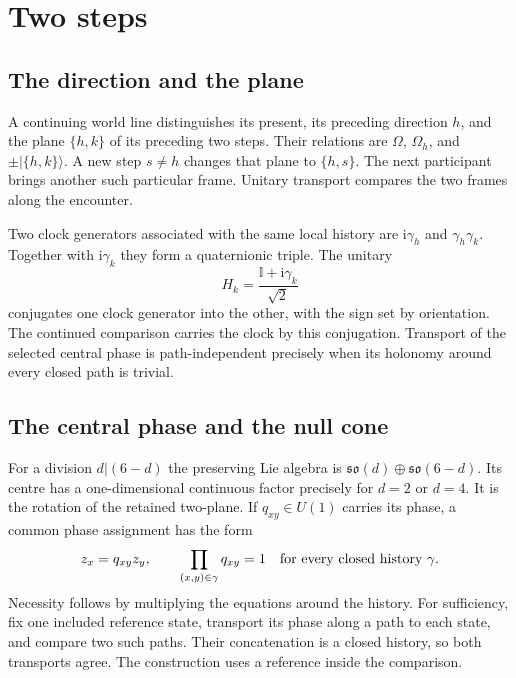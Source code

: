 \documentclass[aps,prx,onecolumn,10pt,notitlepage,nofootinbib,longbibliography]{revtex4-2}
\numberwithin{equation}{section}
\numberwithin{table}{section}
\newcommand{\Id}{\mathbb I}
\newcommand{\ii}{\mathrm i}
\begin{document}
\section{Two steps}
\label{sec:step-two}

\subsection{The direction and the plane}
A continuing world line distinguishes its present, its preceding direction $h$, and the plane $\{h,k\}$ of its preceding two steps. Their relations are $\Omega$, $\Omega_h$, and $\pm \lvert\{h,k\}\rangle$. A new step $s\ne h$ changes that plane to $\{h,s\}$. The next participant brings another such particular frame. Unitary transport compares the two frames along the encounter.

Two clock generators associated with the same local history are $\ii\gamma_h$ and $\gamma_h\gamma_k$. Together with $\ii\gamma_k$ they form a quaternionic triple. The unitary
\begin{equation}
 H_k=\frac{\Id+\ii\gamma_k}{\sqrt2}
\end{equation}
conjugates one clock generator into the other, with the sign set by orientation. The continued comparison carries the clock by this conjugation. Transport of the selected central phase is path-independent precisely when its holonomy around every closed path is trivial.

\subsection{The central phase and the null cone}

For a division $d|(6-d)$ the preserving Lie algebra is
$\mathfrak{so}(d)\oplus\mathfrak{so}(6-d)$. Its centre has a one-dimensional
continuous factor precisely for $d=2$ or $d=4$. It is the rotation of the
retained two-plane. If $q_{xy}\in U(1)$ carries its phase, a common phase
assignment has the form
\begin{equation}
 z_x=q_{xy}z_y,
 \qquad
 \prod_{(x,y)\in\gamma}q_{xy}=1
 \quad\hbox{for every closed history }\gamma.
 \label{eq:commonphase}
\end{equation}
Necessity follows by multiplying the equations around the history. For
sufficiency, fix one included reference state, transport its phase along a
path to each state, and compare two such paths. Their concatenation is a
closed history, so both transports agree. The construction uses a reference
inside the comparison.
\end{document}
